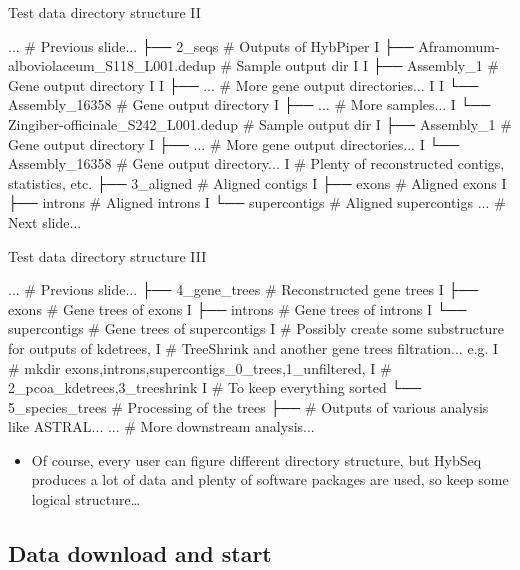 \documentclass[compress, ucs, xelatex, 11pt, xcolor=x11names, aspectratio=169,
	hyperref={
		bookmarks=true,
		unicode=true,
		colorlinks=true,
		pdftitle={HybSeq course},
		plainpages=false,
		pdfauthor={Vojtech Zeisek},
		pdfsubject={Practical processing of HybSeq target enrichment sequencing data on computing grids like MetaCentrum},
		pdfcreator={XeLaTeX},
		pdfkeywords={BASH, command line, GNU, HybSeq, Linux, MetaCentrum, sequencing shell, target enrichment},
		linkcolor=Turquoise4, %
		anchorcolor=DodgerBlue4, %
		citecolor=DodgerBlue4, %
		filecolor=DodgerBlue4, %
		menucolor=Tan4, %
		urlcolor=DarkOliveGreen4, %
		pdftex},
	url={hyphens, lowtilde} %
	]{beamer}
\begin{document}
\begin{frame}[fragile]{Test data directory structure II}
	\begin{bashcode}
        ... # Previous slide...
        ├── 2_seqs # Outputs of HybPiper
        I   ├── Aframomum-alboviolaceum_S118_L001.dedup # Sample output dir
        I   I   ├── Assembly_1 # Gene output directory
        I   I   ├── ... # More gene output directories...
        I   I   └── Assembly_16358 # Gene output directory
        I   ├── ... # More samples...
        I   └── Zingiber-officinale_S242_L001.dedup # Sample output dir
        I       ├── Assembly_1 # Gene output directory
        I       ├── ... # More gene output directories...
        I       └── Assembly_16358 # Gene output directory...
        I    # Plenty of reconstructed contigs, statistics, etc.
        ├── 3_aligned # Aligned contigs
        I   ├── exons # Aligned exons
        I   ├── introns # Aligned introns
        I   └── supercontigs # Aligned supercontigs
        ... # Next slide...
	\end{bashcode}
\end{frame}

\begin{frame}[fragile]{Test data directory structure III}
	\begin{bashcode}
        ... # Previous slide...
        ├── 4_gene_trees # Reconstructed gene trees
        I   ├── exons # Gene trees of exons
        I   ├── introns # Gene trees of introns
        I   └── supercontigs # Gene trees of supercontigs
        I   # Possibly create some substructure for outputs of kdetrees,
        I   # TreeShrink and another gene trees filtration... e.g.
        I   # mkdir {exons,introns,supercontigs}_{0_trees,1_unfiltered,
        I   #   2_pcoa_kdetrees,3_treeshrink}
        I   # To keep everything sorted
        └── 5_species_trees # Processing of the trees
            ├── # Outputs of various analysis like ASTRAL...
            ... # More downstream analysis...
	\end{bashcode}
	\begin{itemize}
		\item Of course, every user can figure different directory structure, but HybSeq produces a lot of data and plenty of software packages are used, so keep some logical structure\ldots
	\end{itemize}
\end{frame}

\subsection{Data download and start}
\end{document}
